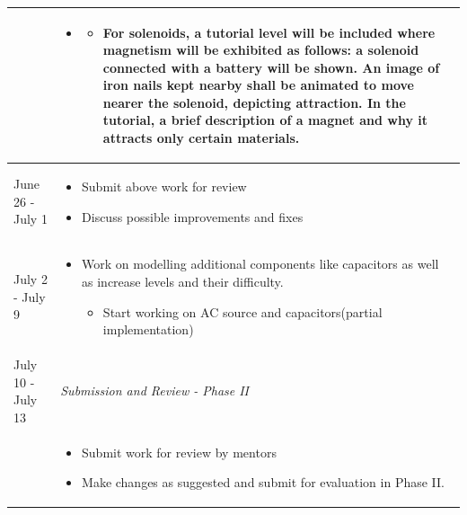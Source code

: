 \documentclass[preprint,12pt]{elsarticle}
\begin{document}
\begin{center}
\begin{tabularx}{\linewidth}{|l|X|}
 & \par
 \parbox{12cm}{
	\begin{itemize}[noitemsep, topsep=2pt]
		\item 
		\begin{itemize}[noitemsep, topsep=2pt]
			\item For solenoids, a tutorial level will be included where magnetism will be exhibited as follows: a solenoid connected with a battery will be shown. An image of iron nails kept nearby shall be animated to move nearer the solenoid, depicting attraction. In the tutorial, a brief description of a magnet and why it attracts only certain materials.
		\end{itemize}
	\end{itemize}	 
 }\\
 \hline

{June 26 - July 1} & \par
\parbox{12cm}{
\begin{itemize}[noitemsep, topsep=2pt]
	\item Submit above work for review
	\item Discuss possible improvements and fixes
\end{itemize}
}\\
\hline

{July 2 - July 9} & \par
\parbox{12cm}{
\begin{itemize}[noitemsep, topsep=2pt]
	\item Work on modelling additional components like capacitors as well as increase levels and their difficulty.
	
	\begin{itemize}
		\item Start working on AC source and capacitors(partial implementation)
	\end{itemize}
\end{itemize}
}\\
\hline\hline

{July 10  - July 13} & {\textit{Submission and Review - Phase II
}}\\
\hline

 & \par
\parbox{12cm}{
\begin{itemize}[noitemsep, topsep=2pt]
	\item Submit work for review by mentors
	\item Make changes as suggested and submit for evaluation in Phase II.
\end{itemize}
}\\
\hline\hline


\end{tabularx}
\end{center}
\end{document}
